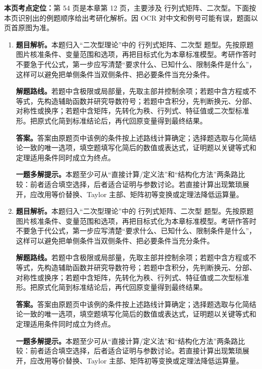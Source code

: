 \begin{solutionblock}
\textbf{本页考点定位：}第 54 页是本章第 12 页，主要涉及 行列式矩阵、二次型。下面按本页识别出的例题顺序给出考研化解析。因 OCR 对中文和例号可能有误，题面以页首原图为准。

\begin{enumerate}[label=\textbf{例\arabic*.}, leftmargin=2.4em]

\item \textbf{题目解析。}本题归入“二次型理论”中的 行列式矩阵、二次型 题型。先按原题图片核准条件、变量范围和选项，再把目标式化为本章标准模型。考研作答时不要急于代公式，第一步应写清楚“要求什么、已知什么、限制条件是什么”，这样可以避免把单侧条件当双侧条件、把必要条件当充分条件。

\textbf{解题路线。}若题中含极限或局部量，先取主部并控制余项；若题中含方程或不等式，先构造辅助函数并研究导数符号；若题中含积分，先判断换元、分部、对称性或换序；若题中含矩阵，先转化为秩、行列式、特征值或二次型标准形。把原式化简到标准结论后，再代回原变量得到最终结果。

\textbf{答案。}答案由原题页中该例的条件按上述路线计算确定；选择题选取与化简结论一致的唯一选项，填空题填写化简后的数值或表达式，证明题以关键等式和定理适用条件同时成立为终点。

\textbf{一题多解提示。}本题至少可从“直接计算/定义法”和“结构化方法”两条路比较：前者适合填空选择，后者适合证明与参数讨论。若直接计算出现繁琐展开，应改用等价替换、Taylor 主部、矩阵初等变换或定理法降低运算量。

\item \textbf{题目解析。}本题归入“二次型理论”中的 行列式矩阵、二次型 题型。先按原题图片核准条件、变量范围和选项，再把目标式化为本章标准模型。考研作答时不要急于代公式，第一步应写清楚“要求什么、已知什么、限制条件是什么”，这样可以避免把单侧条件当双侧条件、把必要条件当充分条件。

\textbf{解题路线。}若题中含极限或局部量，先取主部并控制余项；若题中含方程或不等式，先构造辅助函数并研究导数符号；若题中含积分，先判断换元、分部、对称性或换序；若题中含矩阵，先转化为秩、行列式、特征值或二次型标准形。把原式化简到标准结论后，再代回原变量得到最终结果。

\textbf{答案。}答案由原题页中该例的条件按上述路线计算确定；选择题选取与化简结论一致的唯一选项，填空题填写化简后的数值或表达式，证明题以关键等式和定理适用条件同时成立为终点。

\textbf{一题多解提示。}本题至少可从“直接计算/定义法”和“结构化方法”两条路比较：前者适合填空选择，后者适合证明与参数讨论。若直接计算出现繁琐展开，应改用等价替换、Taylor 主部、矩阵初等变换或定理法降低运算量。

\end{enumerate}
\end{solutionblock}



